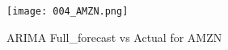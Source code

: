 \documentclass{article}
\begin{document}
\begin{figure}[h]
\centering
\texttt{[image: 004\_AMZN.png]}
\caption{ARIMA Full_forecast vs Actual for AMZN}
\label{fig:AMZN_full_forecast}
\end{figure}
\end{document}
